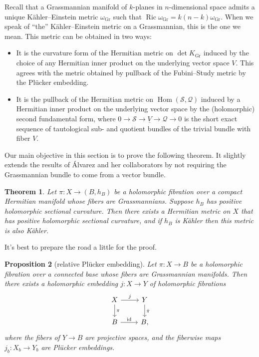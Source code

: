 \documentclass[10pt,a4paper]{amsart}
\newtheorem{theo}{Theorem}[section]
\newtheorem{prop}[theo]{Proposition}
\theoremstyle{definition}
\newcommand{\cc}[1]{\mathcal{#1}}
\DeclareMathOperator{\Ric}{Ric}
\DeclareMathOperator{\Gr}{Gr}
\DeclareMathOperator{\Hom}{Hom}
\DeclareMathOperator{\id}{id}
\begin{document}
Recall that a Grassmannian manifold of $k$-planes in $n$-dimensional space admits a unique K\"ahler--Einstein metric $\omega_{\Gr}$ such that
$\Ric \omega_{\Gr} = k(n-k) \omega_{\Gr}$.
When we speak of ``the'' K\"ahler--Einstein metric on a Grassmannian, this is the one we mean.
This metric can be obtained in two ways:

\begin{itemize}
  \item It is the curvature form of the Hermitian metric on $\det K_{\Gr}$ induced by the choice of any Hermitian inner product on the underlying vector space $V$. This agrees with the metric obtained by pullback of the Fubini--Study metric by the Pl\"ucker embedding.

  \item It is the pullback of the Hermitian metric on $\Hom(\cc S, \cc Q)$ induced by a Hermitian inner product on the underlying vector space by the (holomorphic) second fundamental form, where $0 \to \cc S \to \underline {V} \to \cc Q \to 0$ is the short exact sequence of tautological sub- and quotient bundles of the trivial bundle with fiber $V$.
\end{itemize}

Our main objective in this section is to prove the following theorem.
It slightly extends the results of \'Alvarez and her collaborators by not requiring the Grassmannian bundle to come from a vector bundle.

\begin{theo}
\label{thm:holomorphic-sectional-positive}
Let $\pi : X \to (B,h_{B})$ be a holomorphic fibration over a compact Hermitian manifold whose fibers are Grassmannians.
Suppose $h_{B}$ has positive holomorphic sectional curvature.
Then there exists a Hermitian metric on $X$ that has positive holomorphic sectional curvature, and if $h_{B}$ is K\"ahler then this metric is also K\"ahler.
\end{theo}

It's best to prepare the road a little for the proof.


\begin{prop}[relative Pl\"ucker embedding]
Let $\pi : X \to B$ be a holomorphic fibration over a connected base whose fibers are Grassmannian manifolds.
Then there exists a holomorphic embedding $j : X \to Y$ of holomorphic fibrations
\[
\begin{tikzcd}
  X \ar[d,"\pi"] \ar[r,"j"] & Y \ar[d,"\hat\pi"]
  \\
  B \ar[r,"\id"] & B,
\end{tikzcd}
\]
where the fibers of $Y \to B$ are projective spaces, and the fiberwise maps $j_{b} : X_{b} \to Y_{b}$ are Pl\"ucker embeddings.
\end{prop}
\end{document}
